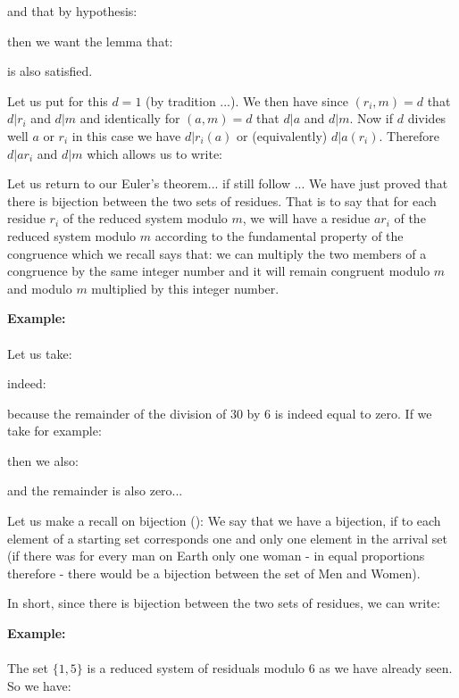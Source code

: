 \begin{dem}
	and that by hypothesis:
	
	then we want the lemma that:
	
	is also satisfied.
	
	Let us put for this $d=1$ (by tradition ...). We then have since $(r_i,m)=d$ that $d|r_i$ and $d|m$ and identically for $(a,m)=d$ that $d|a$ and $d|m$. Now if $d$ divides well $a$ or $r_i$ in this case we have $d|r_i(a)$ or (equivalently) $d|a(r_i)$. Therefore $d|ar_i$ and $d|m$ which allows us to write:
	
	Let us return to our Euler's theorem... if still follow ... We have just proved that there is bijection between the two sets of residues. That is to say that for each residue $r_i$ of the reduced system modulo $m$, we will have a residue $ar_i$ of the reduced system modulo $m$ according to the fundamental property of the congruence which we recall says that: we can multiply the two members of a congruence by the same integer number and it will remain congruent modulo $m$ and modulo $m$ multiplied by this integer number.
	
	\begin{tcolorbox}[colframe=black,colback=white,sharp corners]
	\textbf{{\Large {}}Example:}\\\\
	Let us take:
	
	indeed:
	
	because the remainder of the division of $30$ by $6$ is indeed equal to zero. If we take for example:
	
	then we also:
	
	and the remainder is also zero...
	\end{tcolorbox}
	Let us make a recall on bijection (): We say that we have a bijection, if to each element of a starting set corresponds one and only one element in the arrival set (if there was for every man on Earth only one woman - in equal proportions therefore - there would be a bijection between the set of Men and Women).

	In short, since there is bijection between the two sets of residues, we can write:
	
	\begin{tcolorbox}[colframe=black,colback=white,sharp corners]
	\textbf{{\Large {}}Example:}\\\\
	The set $\{1,5\}$ is a reduced system of residuals modulo $6$ as we have already seen. So we have:
	

\end{tcolorbox}
\end{dem}
